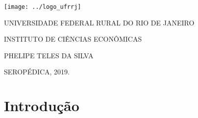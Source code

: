 \documentclass[a4paper,
               article,
               12pt,
               openany,
               oneside,
               english,
               brazil]{abntex2}
\numberwithin{equation}{section}
\begin{document}
\renewcommand{\imprimircapa}{%
    \begin{capa}%
        \center
        \texttt{[image: ../logo\_ufrrj]}
        
        \ABNTEXchapterfont
        \large UNIVERSIDADE FEDERAL RURAL DO RIO DE JANEIRO

        \large INSTITUTO DE CIÊNCIAS ECONÔMICAS

        \large PHELIPE TELES DA SILVA
        \vfill
        \begin{center}
            \ABNTEXchapterfont
            \bfseries
            \large \imprimirtitulo
        \end{center}
        \vfill
        \large SEROPÉDICA, 2019.
        \vspace*{1cm}
    \end{capa}}
\imprimircapa


\imprimirfolhaderosto


\tableofcontents*
\clearpage


\textual

\pagestyle{fancy}
\renewcommand{\headrulewidth}{0pt}

\section{Introdução}
\end{document}
